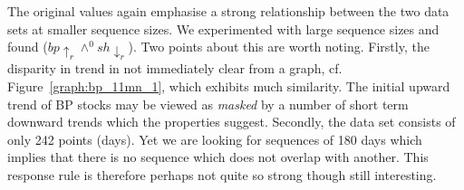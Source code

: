 {\begin{table}[ht]
\begin{center}
\end{center}
\caption{\label{tab:tr_bp_sh_res}Results for 242 days of BP and Shell
		from Dec 1997 to Oct 1998} 
\end{table}
}

The original values again emphasise a strong relationship between the
two data sets at smaller sequence sizes. We experimented with large
sequence sizes and found 
\linebreak {} ($bp \uparrow_r \wedge^0 sh \downarrow_r$).
Two points
about this are worth noting. Firstly, the disparity in trend in not
immediately clear from a graph, cf. Figure~\ref{graph:bp_11mn_1},
which exhibits much similarity. The initial upward trend of BP stocks
may be viewed as {\em masked} by a number of short term downward
trends which the properties suggest.
Secondly, the data set consists of
only 242 points (days). Yet we are looking for sequences of 180 days
which implies that there is no sequence which does not overlap with
another. This response rule is therefore perhaps not quite so strong
though still interesting. 

\medskip

